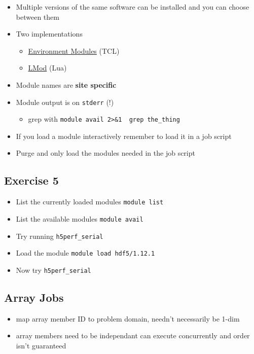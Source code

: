 \documentclass[
  letterpaper,
  DIV=11,
  numbers=noendperiod]{scrartcl}
\providecommand{\tightlist}{%
  \setlength{\itemsep}{0pt}\setlength{\parskip}{0pt}}
\begin{document}
\begin{itemize}
\tightlist
\item
  Multiple versions of the same software can be installed and you can
  choose between them
\item
  Two implementations

  \begin{itemize}
  \tightlist
  \item
    \href{https://modules.readthedocs.io/en/latest/}{Environment
    Modules} (TCL)
  \item
    \href{https://lmod.readthedocs.io/en/latest/}{LMod} (Lua)
  \end{itemize}
\item
  Module names are \textbf{site specific}
\item
  Module output is on \texttt{stderr} (!)

  \begin{itemize}
  \tightlist
  \item
    grep with
    \texttt{module\ avail\ 2\textgreater{}\&1\ \textbar{}\ grep\ the\_thing}
  \end{itemize}
\item
  If you load a module interactively remember to load it in a job script
\item
  Purge and only load the modules needed in the job script
\end{itemize}

\subsection{Exercise 5}\label{exercise-5}

\begin{itemize}
\tightlist
\item
  List the currently loaded modules \texttt{module\ list}
\item
  List the available modules \texttt{module\ avail}
\item
  Try running \texttt{h5perf\_serial}
\item
  Load the module \texttt{module\ load\ hdf5/1.12.1}
\item
  Now try \texttt{h5perf\_serial}
\end{itemize}

\subsection{Array Jobs}\label{array-jobs}

\begin{itemize}
\tightlist
\item
  map array member ID to problem domain, needn't necessarily be 1-dim
\item
  array members need to be independant can execute concurrently and
  order isn't guaranteed
\end{itemize}
\end{document}
